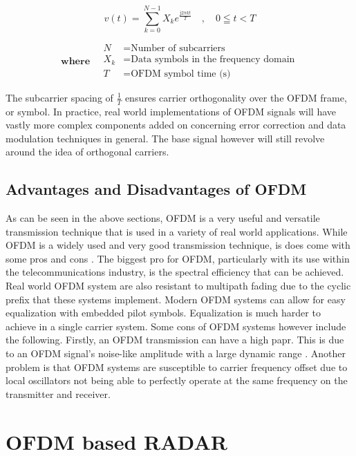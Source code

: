 \documentclass[class=report,11pt,crop=false]{standalone}
\begin{document}
\begin{equation}
    v(t) = \sum_{k=0}^{N-1} X_k e^{\frac{\mathrm{j} 2 \pi k t}{T}}\quad,\quad0 \leqq t < T   \label{eq:ofdmequation}
\end{equation}


\[
\textbf{where} \quad
\begin{aligned}
N & = \text{Number of subcarriers} \\
X_k & = \text{Data symbols in the frequency domain} \\
T & = \text{OFDM symbol time (s)}
\end{aligned}
\]

The subcarrier spacing of \(\frac{1}{T}\) ensures carrier orthogonality over the OFDM frame, or symbol. In practice, real world implementations of OFDM signals will have vastly more complex components added on concerning error correction and data modulation techniques in general. The base signal however will still revolve around the idea of orthogonal carriers.

\subsection{Advantages and Disadvantages of OFDM}
As can be seen in the above sections, OFDM is a very useful and versatile transmission technique that is used in a variety of real world applications. While OFDM is a widely used and very good transmission technique, is does come with some pros and cons \cite{rfwirelessworld_ofdm_advantages_disadvantages}. The biggest pro for OFDM, particularly with its use within the telecommunications industry, is the spectral efficiency that can be achieved. Real world OFDM system are also resistant to multipath fading due to the cyclic prefix that these systems implement. Modern OFDM systems can allow for easy equalization with embedded pilot symbols. Equalization is much harder to achieve in a single carrier system. Some cons of OFDM systems however include the following. Firstly, an OFDM transmission can have a high \gls{papr}. This is due to an OFDM signal's noise-like amplitude with a large dynamic range \cite{rfwirelessworld_ofdm_advantages_disadvantages}. Another problem is that OFDM systems are susceptible to carrier frequency offset due to local oscillators not being able to perfectly operate at the same frequency on the transmitter and receiver. 



\section{OFDM based RADAR}
\end{document}
